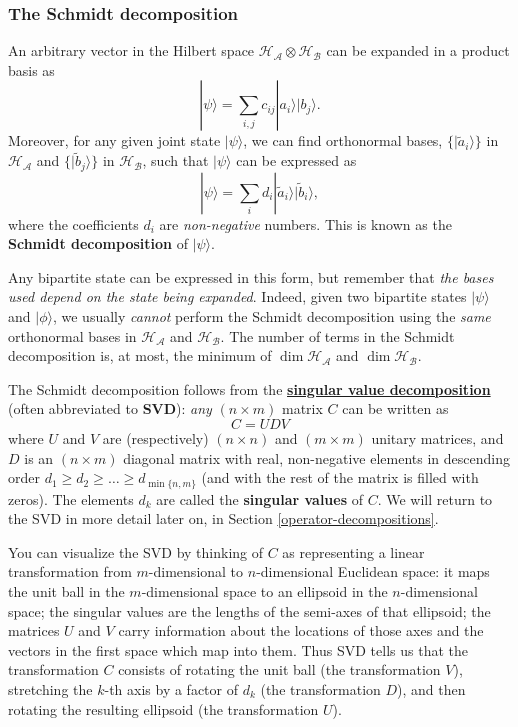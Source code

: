 \documentclass[fleqn]{article}
\begin{document}
\hypertarget{the-schmidt-decomposition}{%
\subsubsection{The Schmidt decomposition}\label{the-schmidt-decomposition}}

An arbitrary vector in the Hilbert space \(\mathcal{H}_{\mathcal{A}}\otimes \mathcal{H}_{\mathcal{B}}\) can be expanded in a product basis as
\[
  |\psi\rangle
  = \sum_{i,j} c_{ij}|a_i\rangle|b_j\rangle.
\]
Moreover, for any given joint state \(|\psi\rangle\), we can find orthonormal bases, \(\{|\tilde{a}_i\rangle\}\) in \(\mathcal{H}_{\mathcal{A}}\) and \(\{|\tilde{b}_j\rangle\}\) in \(\mathcal{H}_{\mathcal{B}}\), such that \(|\psi\rangle\) can be expressed as
\[
  |\psi\rangle
  = \sum_{i} d_{i}|\tilde a_i\rangle|\tilde b_i\rangle,
\]
where the coefficients \(d_i\) are \emph{non-negative} numbers.
This is known as the \textbf{Schmidt decomposition} of \(|\psi\rangle\).

Any bipartite state can be expressed in this form, but remember that \emph{the bases used depend on the state being expanded}.
Indeed, given two bipartite states \(|\psi\rangle\) and \(|\phi\rangle\), we usually \emph{cannot} perform the Schmidt decomposition using the \emph{same} orthonormal bases in \(\mathcal{H}_{\mathcal{A}}\) and \(\mathcal{H}_{\mathcal{B}}\).
The number of terms in the Schmidt decomposition is, at most, the minimum of \(\dim\mathcal{H}_{\mathcal{A}}\) and \(\dim\mathcal{H}_{\mathcal{B}}\).

The Schmidt decomposition follows from the \href{https://en.wikipedia.org/wiki/Singular_value_decomposition}{\textbf{singular value decomposition}} (often abbreviated to \textbf{SVD}): \emph{any} \((n\times m)\) matrix \(C\) can be written as
\[
  C = UDV
\]
where \(U\) and \(V\) are (respectively) \((n\times n)\) and \((m\times m)\) unitary matrices, and \(D\) is an \((n\times m)\) diagonal matrix with real, non-negative elements in descending order \(d_1\geqslant d_2\geqslant\ldots\geqslant d_{\min\{n,m\}}\) (and with the rest of the matrix is filled with zeros).
The elements \(d_k\) are called the \textbf{singular values} of \(C\).
We will return to the SVD in more detail later on, in Section \ref{operator-decompositions}.

You can visualize the SVD by thinking of \(C\) as representing a linear
transformation from \(m\)-dimensional to \(n\)-dimensional Euclidean space: it maps the unit ball in the \(m\)-dimensional space to an ellipsoid in
the \(n\)-dimensional space; the singular values are the lengths of
the semi-axes of that ellipsoid; the matrices \(U\) and \(V\) carry
information about the locations of those axes and the vectors in
the first space which map into them.
Thus SVD tells us that the transformation \(C\) consists of rotating the unit ball (the transformation \(V\)), stretching the \(k\)-th axis by a factor of \(d_k\) (the transformation \(D\)), and then rotating the resulting ellipsoid (the transformation \(U\)).
\end{document}
